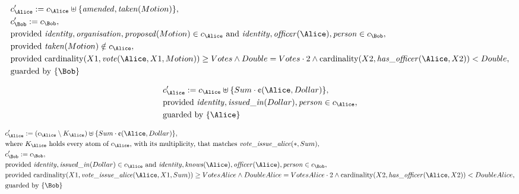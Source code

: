 \begin{align*}
&
c'_
{
\Alice
}
 := 
c_
{
\Alice
}
 \uplus 
\{
\mathit{\detokenize{
amended
}}
,
\mathit{\detokenize{
taken
}}
(
Motion
)
\}
,\\
&
c'_
{
\Bob
}
 := 
c_
{
\Bob
}
,\\
&
\text{provided } 
\mathit{\detokenize{
identity
}}
,
\mathit{\detokenize{
organisation
}}
,
\mathit{\detokenize{
proposed
}}
(
Motion
)
 \in c_
{
\Alice
}
 \text{ and } 
\mathit{\detokenize{
identity
}}
,
\mathit{\detokenize{
officer
}}
(
\Alice
)
,
\mathit{\detokenize{
person
}}
 \in c_
{
\Bob
}
,\\
&
\text{provided } 
\mathit{\detokenize{
taken
}}
(
Motion
)
 \notin c_
{
\Alice
}
,\\
&
\text{provided } 
\mathrm{cardinality}(
X1
,
\mathit{\detokenize{
vote
}}
(
\Alice
,
X1
,
Motion
)
)
\ge
Votes
\land
Double
=
Votes
\cdot
2
\land
\mathrm{cardinality}(
X2
,
\mathit{\detokenize{
has_officer
}}
(
\Alice
,
X2
)
)
<
Double
,\\
&
\text{guarded by } \{
\Bob
\}
\end{align*}

\begin{align*}
&
c'_
{
\Alice
}
 := 
c_
{
\Alice
}
 \uplus 
\{
Sum
\cdot
\text{\textcent}
(
\Alice
,
Dollar
)
\}
,\\
&
\text{provided } 
\mathit{\detokenize{
identity
}}
,
\mathit{\detokenize{
issued_in
}}
(
Dollar
)
,
\mathit{\detokenize{
person
}}
 \in c_
{
\Alice
}
,\\
&
\text{guarded by } \{
\Alice
\}
\end{align*}

\begin{align*}
&
c'_
{
\Alice
}
 := 
(
c_
{
\Alice
}
 \setminus K_
{
\Alice
}
) \uplus 
\{
Sum
\cdot
\text{\textcent}
(
\Alice
,
Dollar
)
\}
,\\
&
\text{where } K_
{
\Alice
}
 \text{ holds every atom of } c_
{
\Alice
}
 \text{, with its multiplicity, that matches } 
\mathit{\detokenize{
vote_issue_alice
}}
(
\ast
,
Sum
)
,\\
&
c'_
{
\Bob
}
 := 
c_
{
\Bob
}
,\\
&
\text{provided } 
\mathit{\detokenize{
identity
}}
,
\mathit{\detokenize{
issued_in
}}
(
Dollar
)
 \in c_
{
\Alice
}
 \text{ and } 
\mathit{\detokenize{
identity
}}
,
\mathit{\detokenize{
knows
}}
(
\Alice
)
,
\mathit{\detokenize{
officer
}}
(
\Alice
)
,
\mathit{\detokenize{
person
}}
 \in c_
{
\Bob
}
,\\
&
\text{provided } 
\mathrm{cardinality}(
X1
,
\mathit{\detokenize{
vote_issue_alice
}}
(
\Alice
,
X1
,
Sum
)
)
\ge
VotesAlice
\land
DoubleAlice
=
VotesAlice
\cdot
2
\land
\mathrm{cardinality}(
X2
,
\mathit{\detokenize{
has_officer
}}
(
\Alice
,
X2
)
)
<
DoubleAlice
,\\
&
\text{guarded by } \{
\Bob
\}
\end{align*}
